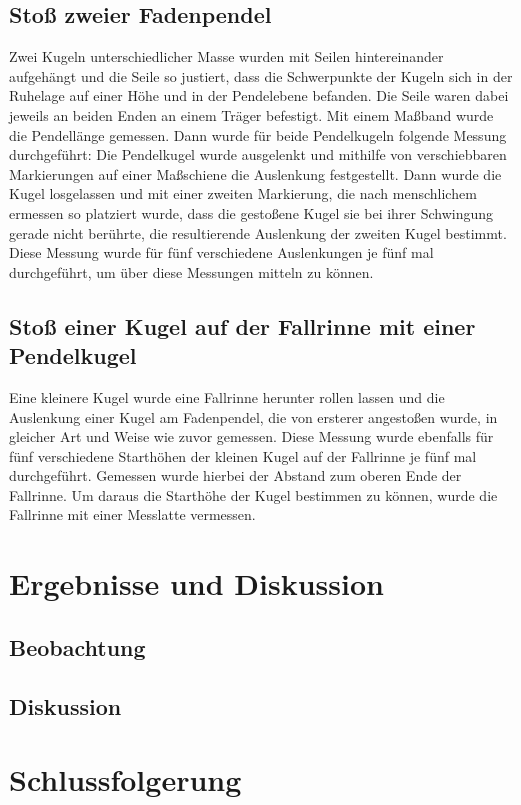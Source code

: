 \documentclass[
	a4paper,
	12pt,
	pagesize,
	ngerman
]{scrartcl}
\begin{document}
	\subsection{Stoß zweier Fadenpendel} %
	Zwei Kugeln unterschiedlicher Masse wurden mit Seilen hintereinander aufgehängt und die Seile so justiert, dass die Schwerpunkte der Kugeln sich in der Ruhelage auf einer Höhe und in der Pendelebene befanden.
	Die Seile waren dabei jeweils an beiden Enden an einem Träger befestigt.
	Mit einem Maßband wurde die Pendellänge gemessen.
	Dann wurde für beide Pendelkugeln folgende Messung durchgeführt:
	Die Pendelkugel wurde ausgelenkt und mithilfe von verschiebbaren Markierungen auf einer Maßschiene die Auslenkung festgestellt.
	Dann wurde die Kugel losgelassen und mit einer zweiten Markierung, die nach menschlichem ermessen so platziert wurde, dass die gestoßene Kugel sie bei ihrer Schwingung gerade nicht berührte, die resultierende Auslenkung der zweiten Kugel bestimmt.
	Diese Messung wurde für fünf verschiedene Auslenkungen je fünf mal durchgeführt, um über diese Messungen mitteln zu können. %
	\subsection{Stoß einer Kugel auf der Fallrinne mit einer Pendelkugel} %
	Eine kleinere Kugel wurde eine Fallrinne herunter rollen lassen und die Auslenkung einer Kugel am Fadenpendel, die von ersterer angestoßen wurde, in gleicher Art und Weise wie zuvor gemessen.
	Diese Messung wurde ebenfalls für fünf  verschiedene Starthöhen der kleinen Kugel auf der Fallrinne je fünf mal durchgeführt.
	Gemessen wurde hierbei der Abstand zum oberen Ende der Fallrinne.
	Um daraus die Starthöhe der Kugel bestimmen zu können, wurde die Fallrinne mit einer Messlatte vermessen. %
	
	
	\section{Ergebnisse und Diskussion}
	

	\subsection{Beobachtung}


	\subsection{Diskussion}
	
	\section{Schlussfolgerung}
	
\end{document}

